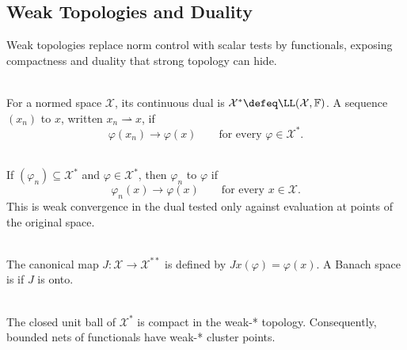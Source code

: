 \subsection{Weak Topologies and Duality}

%

Weak topologies replace norm control with scalar tests by functionals, exposing compactness and duality that strong topology can hide.

\begin{definition} \label{def:dual-space-and-weak-convergence} \\
For a normed space $\mathcal{X}$, its continuous dual is $\mathcal{X}^*\defeq\LL(\mathcal{X},\mathbb{F})$. A sequence $(x_n)$  to $x$, written $x_n\rightharpoonup x$, if
\[
\varphi(x_n)\to\varphi(x)\qquad\text{for every }\varphi\in\mathcal{X}^*.
\]
\end{definition}

\begin{definition} \label{def:weak-star-convergence} \\
If $(\varphi_n)\subseteq\mathcal{X}^*$ and $\varphi\in\mathcal{X}^*$, then $\varphi_n$  to $\varphi$ if
\[
\varphi_n(x)\to\varphi(x)\qquad\text{for every }x\in\mathcal{X}.
\]
This is weak convergence in the dual tested only against evaluation at points of the original space.
\end{definition}

\begin{definition} \label{def:reflexive-banach-space} \\
The canonical map $J:\mathcal{X}\to\mathcal{X}^{**}$ is defined by $Jx(\varphi)=\varphi(x)$. A Banach space is  if $J$ is onto.
\end{definition}

\begin{theorem} \label{thm:banach-alaoglu} \\
The closed unit ball of $\mathcal{X}^*$ is compact in the weak-* topology. Consequently, bounded nets of functionals have weak-* cluster points.
\end{theorem}
